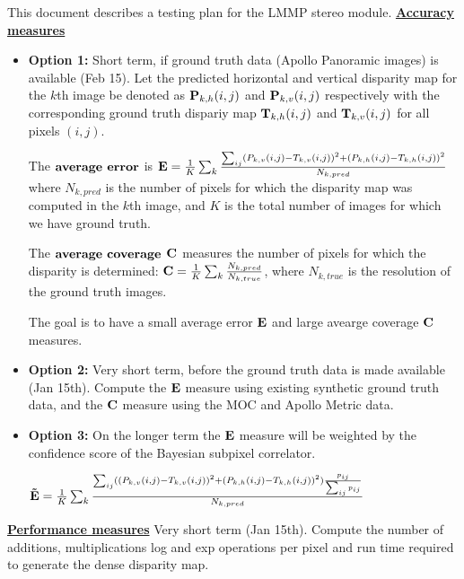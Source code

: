 \documentclass[12pt]{article}
\begin{document}
\maketitle

This document describes a testing plan for the LMMP stereo module.
{\underline {\bf Accuracy measures}}

\begin{itemize}
\item {\bf Option 1:} Short term, if ground truth data (Apollo Panoramic images) is available (Feb 15). Let the predicted horizontal and vertical
      disparity map for the $k$th image be denoted as ${\bf P}_{k, h}(i,j)$ and ${\bf P}_{k, v}(i,j)$  respectively with the corresponding ground truth dispariy map ${\bf T}_{k, h}(i,j)$ and ${\bf T}_{k, v}(i,j)$ for all pixels $(i,j)$. 

The ${\bf average}$ ${\bf error}$ is 
      ${\bf E} =\frac{1}{K}\sum_k\frac{\sum_{ij} (P_{k,v}(i,j)-T_{k,v}(i,j))^2 + (P_{k,h}(i,j)-T_{k,h}(i,j))^2}{N_{k,pred}} $ where $N_{k,pred}$ 
      is the number of pixels for which the disparity map was computed in the $k$th image, and $K$ is the total number of images for 
      which we have ground truth. 

      The ${\bf average}$ ${\bf coverage}$ ${\bf C}$ measures the number of pixels for which the disparity is determined: 
${\bf C} = \frac{1}{K}\sum_k\frac{N_{k,pred}}{N_{k,true}}$, where $N_{k, true}$ is the resolution of the ground truth images.
  
     The goal is to have a small average error ${\bf E}$ and large avearge coverage ${\bf C}$ measures.

\item {\bf Option 2:} Very short term, before the ground truth data is made available (Jan 15th).
                    Compute the ${\bf E}$ measure using existing synthetic ground truth data, and the ${\bf C}$ 
                    measure using the MOC and Apollo Metric data.

\item {\bf Option 3:} On the longer term the ${\bf E}$ measure will be weighted by the confidence score of the Bayesian subpixel correlator.

 
       ${\bf \tilde E} =\frac{1}{K}\sum_k\frac{\sum_{ij} ((P_{k,v}(i,j)-T_{k,v}(i,j))^2 + (P_{k,h}(i,j)-T_{k,h}(i,j))^2)\frac{p_{ij}}{\sum_{ij}p_{ij}}}{N_{k,pred}} $      
\end{itemize}

{\underline {\bf Performance measures}}
 Very short term (Jan 15th). Compute the number of additions, multiplications log and exp operations per pixel and run time required to generate the dense disparity map.
\end{document}
